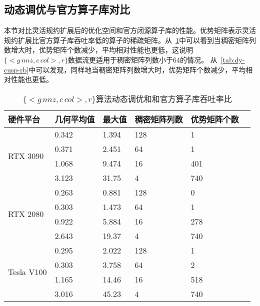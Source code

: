 \subsection{动态调优与官方算子库对比}
本节对比灵活规约扩展后的优化空间和官方闭源算子库的性能。优势矩阵表示灵活规约扩展比官方算子库吞吐率低的算子的稀疏矩阵。从~\ref{tab:dy-cusp-eb}中可以看到当稠密矩阵列数增大时，优势矩阵个数减少，平均相对性能也更低，这说明$\{<g\,nnz , c\,col>,r\}$数据流更适用于稠密矩阵列数小于64的情况。
从~\ref{tab:dy-cusp-rb}中可以发现，同样地当稠密矩阵列数增大时，优势矩阵个数减少，平均相对性能也更低。
\begin{table}
  \centering
  \caption{$\{<g\,nnz , c\,col>,r\}$算法动态调优和和官方算子库吞吐率比}
  \begin{tabular}{llllll}
  \toprule
  硬件平台 & 几何平均值 & 最大值  & 稠密矩阵列数 & 优势矩阵个数 \\
  \midrule
  \multirow{4}{*}{RTX 3090}& 0.342 & 1.394  & 128 & 1\\
                           & 0.371 & 2.451  & 64 & 1\\
                           & 1.068 & 9.474  & 16 & 401\\
                           & 3.123 & 31.75  & 4 & 740\\
  \hline
  \multirow{4}{*}{RTX 2080}& 0.263 & 0.881  & 128 & 0\\
                          & 0.303 & 1.473   & 64 & 1\\
                          & 0.922 & 5.884  & 16 & 278\\
                          & 2.643 & 19.37  & 4 & 740\\
  \hline
  \multirow{4}{*}{Tesla V100}& 0.295 & 2.022  & 128 & 1\\
                          & 0.303 & 3.758  & 64 & 2\\
                          & 1.165 & 14.46  & 16 & 518\\
                          & 3.016 & 45.23  & 4 & 740\\
  \bottomrule
  \end{tabular}
  \label{tab:dy-cusp-eb}
\end{table}
